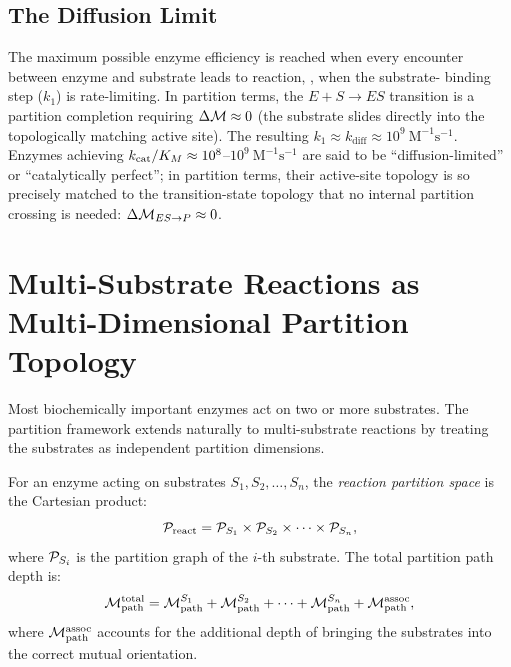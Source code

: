\subsection{The Diffusion Limit}
\label{ssec:diffusion_limit}

The maximum possible enzyme efficiency is reached when every encounter
between enzyme and substrate leads to reaction, \ie, when the substrate-
binding step ($k_1$) is rate-limiting. In partition terms, the $E+S \to ES$
transition is a partition completion requiring $\Delta\mathcal{M} \approx 0$
(the substrate slides directly into the topologically matching active site).
The resulting $k_1 \approx k_{\mathrm{diff}} \approx 10^9\ \mathrm{M}^{-1}\mathrm{s}^{-1}$.
Enzymes achieving $k_{\mathrm{cat}}/K_M \approx 10^8$--$10^9\ \mathrm{M}^{-1}\mathrm{s}^{-1}$
are said to be ``diffusion-limited'' or ``catalytically perfect''; in
partition terms, their active-site topology is so precisely matched to
the transition-state topology that no internal partition crossing is needed:
$\Delta\mathcal{M}_{ES \to P} \approx 0$.

\section{Multi-Substrate Reactions as Multi-Dimensional Partition Topology}
\label{sec:multisubstrate}

Most biochemically important enzymes act on two or more substrates. The
partition framework extends naturally to multi-substrate reactions by treating
the substrates as independent partition dimensions.

\begin{definition}
\label{def:multisubstrate_space}
For an enzyme acting on substrates $S_1, S_2, \ldots, S_n$, the
\emph{reaction partition space} is the Cartesian product:
\begin{equation}
  \mathcal{P}_{\mathrm{react}} = \mathcal{P}_{S_1} \times \mathcal{P}_{S_2} \times \cdots \times \mathcal{P}_{S_n},
\end{equation}
where $\mathcal{P}_{S_i}$ is the partition graph of the $i$-th substrate.
The total partition path depth is:
\begin{equation}
  \mathcal{M}_{\mathrm{path}}^{\mathrm{total}}
    = \mathcal{M}_{\mathrm{path}}^{S_1} + \mathcal{M}_{\mathrm{path}}^{S_2}
      + \cdots + \mathcal{M}_{\mathrm{path}}^{S_n}
      + \mathcal{M}_{\mathrm{path}}^{\mathrm{assoc}},
  \label{eq:multisubstrate_depth}
\end{equation}
where $\mathcal{M}_{\mathrm{path}}^{\mathrm{assoc}}$ accounts for the
additional depth of bringing the substrates into the correct mutual orientation.
\end{definition}

